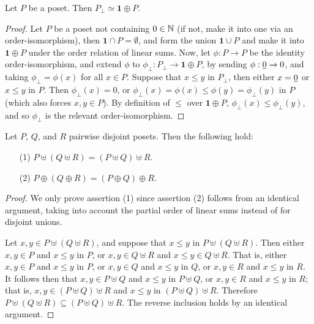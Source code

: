 \begin{proposition}\label{proposition_1.5.2}
  Let $P$ be a poset. Then $P_\bot \simeq \textbf{1} \oplus P$.
\end{proposition}
\begin{proof}
  Let $P$ be a poset not containing $0 \in \mathbb{N}$ (if not, make it into
  one via an order-isomorphism), then $\textbf{1} \cap P=\emptyset$,
  and form the union $\textbf{1} \cup P$ and make it into $\textbf{1}
  \oplus P$ under the order relation of linear sums. Now, let $\phi:P
  \xrightarrow{} P$ be the identity order-isomorphism, and extend
  $\phi$ to $\phi_\bot:P_\bot \xrightarrow{} \textbf{1} \oplus P$, by
  sending $\phi:\underline{0} \xrightarrow{} 0$, and taking
  $\phi_\bot=\phi(x)$ for all $x \in P$. Suppose that $x \leq y$ in
  $P_\bot$, then either $x=\underline{0}$ or $x \leq y$ in $P$. Then
  $\phi_\bot(x)=0$, or $\phi_\bot(x)=\phi(x) \leq
  \phi(y)=\phi_\bot(y)$ in $P$ (which also forces $x,y \in P$). By
  definition of $\leq$ over $\textbf{1} \oplus P$, $\phi_\bot(x) \leq
  \phi_\bot(y)$, and so $\phi_\bot$ is the relevant order-isomorphism.
\end{proof}

\begin{proposition}\label{proposition_1.5.3}
  Let $P$,  $Q$, and  $R$ pairwise disjoint posets. Then the following
  hold:
  \begin{enumerate}
    \item[(1)] $P \uplus (Q \uplus R)=(P \uplus Q) \uplus R$.
    \item[(2)] $P \oplus (Q \oplus R)=(P \oplus Q) \oplus R$.
  \end{enumerate}
\end{proposition}
\begin{proof}
  We only prove assertion (1) since assertion (2) follows from an
  identical argument, taking into account the partial order of linear
  sums instead of for disjoint unions.

  Let $x,y \in P \uplus (Q \uplus R)$, and suppose that $x \leq y$ in
  $P \uplus (Q \uplus R)$. Then either $x,y \in P$ and $x \leq y$ in
  $P$, or  $x,y \in Q \uplus R$ and $x \leq y \in Q \uplus R$. That
  is, either $x,y \in P$ and $x \leq y$ in $P$, or $x,y \in Q$ and $x
  \leq y$ in $Q$, or  $x,y \in R$ and $x \leq y$ in $R$. It follows
  then that $x,y \in P \uplus Q$ and $x \leq y$ in $P \uplus Q$, or
  $x,y \in R$ and $x \leq y$ in $R$; that is, $x,y \in (P \uplus Q)
  \uplus R$  and $x \leq y$ in $(P \uplus Q) \uplus R$. Therefore $P
  \uplus (Q \uplus R) \subseteq (P \uplus Q) \uplus R$. The reverse
  inclusion holds by an identical argument.
\end{proof}


